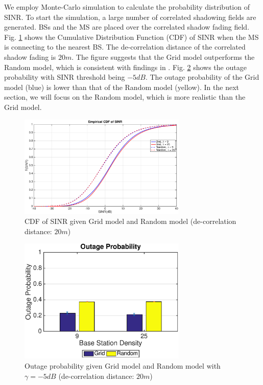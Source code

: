 \documentclass[journal,10pt]{IEEEtran}
\begin{document}
 \par We employ Monte-Carlo simulation to calculate the probability distribution of SINR. To start the simulation, a large number of correlated shadowing fields are generated. BSs and the MS are placed over the correlated shadow fading field. Fig. \ref{4:cdf1} shows the Cumulative Distribution Function (CDF) of SINR when the MS is connecting to the nearest BS. The de-correlation distance of the correlated shadow fading is $20m$. The figure suggests that the Grid model outperforms the Random model, which is consistent with findings in \cite{andrews2011tractable}. Fig. \ref{4:outage1} shows the outage probability with SINR threshold being $-5dB$. The outage probability of the Grid model (blue) is lower than that of the Random model (yellow). In the next section, we will focus on the Random model, which is more realistic than the Grid model.
 \begin{figure}
 \centering
 \includegraphics[width=8cm]{GridVSRandom.eps}
 \caption{CDF of SINR given Grid model and Random model (de-correlation distance: $20m$)}
 \label{4:cdf1}
 \end{figure}
 \begin{figure}
 \centering
 \includegraphics[width=8cm]{OutageProbGridVSRandom.eps}
 \caption{Outage probability given Grid model and Random model with $\gamma = -5dB$ (de-correlation distance: $20m$)}
 \label{4:outage1}
 \end{figure}
\end{document}
